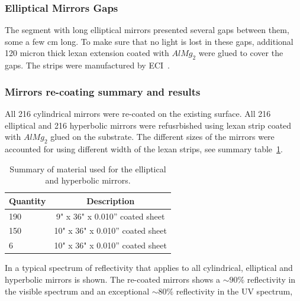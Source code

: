 \subsubsection{Elliptical Mirrors Gaps}

The segment with long elliptical mirrors presented several gaps between them, some a few cm long. To make sure that no light is lost in these gaps,
additional 120 micron thick lexan extension coated with $AlMg_2$ were glued to cover the gaps. The strips were manufactured by ECI~\cite{ECI}.


\subsubsection{Mirrors re-coating summary and results}

All 216 cylindrical mirrors were re-coated on the existing surface. All 216 elliptical and 216 hyperbolic mirrors were refusrbished using lexan strip
coated with $AlMg_2$ glued on the substrate. The different sizes of the mirrors were accounted for using different width of the lexan strips, see
summary table~\ref{tab:strips}.


\begin{table}[h]
	\begin{center}
		\begin{tabular}{| l | c |}
			\hline \hline
			Quantity  & Description \\
			\hline
			190       & 9" x 36" x 0.010” coated sheet    \\
			150       & 10" x 36" x 0.010” coated sheet   \\
			6         & 10" x 36" x 0.010” coated sheet   \\
			\hline \hline
		\end{tabular}
	\end{center}
	\caption{Summary of material used for the elliptical and hyperbolic mirrors.}\label{tab:strips}
\end{table}


In  a typical spectrum of reflectivity that applies to all cylindrical, elliptical and hyperbolic mirrors is shown.
The re-coated mirrors shows a $\sim 90\%$ reflectivity in the visible spectrum and an exceptional $\sim 80\%$
reflectivity in the UV spectrum,

